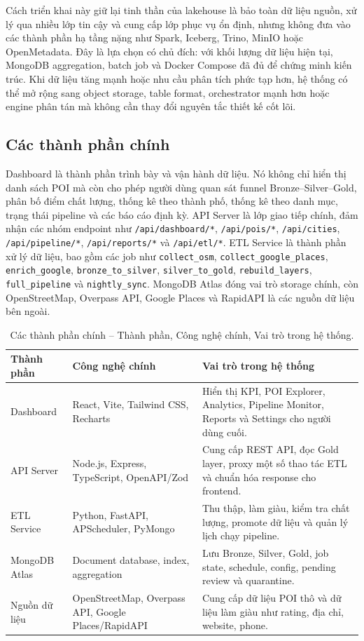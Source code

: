 \documentclass[12pt,a4paper]{article}
\begin{document}
Cách triển khai này giữ lại tinh thần của lakehouse là bảo toàn dữ liệu nguồn, xử lý qua nhiều lớp tin cậy và cung cấp lớp phục vụ ổn định, nhưng không đưa vào các thành phần hạ tầng nặng như Spark, Iceberg, Trino, MinIO hoặc OpenMetadata. Đây là lựa chọn có chủ đích: với khối lượng dữ liệu hiện tại, MongoDB aggregation, batch job và Docker Compose đã đủ để chứng minh kiến trúc. Khi dữ liệu tăng mạnh hoặc nhu cầu phân tích phức tạp hơn, hệ thống có thể mở rộng sang object storage, table format, orchestrator mạnh hơn hoặc engine phân tán mà không cần thay đổi nguyên tắc thiết kế cốt lõi.

\subsection{Các thành phần chính}

Dashboard là thành phần trình bày và vận hành dữ liệu. Nó không chỉ hiển thị danh sách POI mà còn cho phép người dùng quan sát funnel Bronze--Silver--Gold, phân bố điểm chất lượng, thống kê theo thành phố, thống kê theo danh mục, trạng thái pipeline và các báo cáo định kỳ. API Server là lớp giao tiếp chính, đảm nhận các nhóm endpoint như \texttt{/api/dashboard/*}, \texttt{/api/pois/*}, \texttt{/api/cities}, \texttt{/api/pipeline/*}, \texttt{/api/reports/*} và \texttt{/api/etl/*}. ETL Service là thành phần xử lý dữ liệu, bao gồm các job như \texttt{collect\_osm}, \texttt{collect\_google\_places}, \texttt{enrich\_google}, \texttt{bronze\_to\_silver}, \texttt{silver\_to\_gold}, \texttt{rebuild\_layers}, \texttt{full\_pipeline} và \texttt{nightly\_sync}. MongoDB Atlas đóng vai trò storage chính, còn OpenStreetMap, Overpass API, Google Places và RapidAPI là các nguồn dữ liệu bên ngoài.

\begin{longtable}{@{}p{}p{}p{}@{}}
\caption{Các thành phần chính -- Thành phần, Công nghệ chính, Vai trò trong hệ thống.}\\
\toprule
\textbf{Thành phần} & \textbf{Công nghệ chính} & \textbf{Vai trò trong hệ thống} \\
\midrule
Dashboard & React, Vite, Tailwind CSS, Recharts & Hiển thị KPI, POI Explorer, Analytics, Pipeline Monitor, Reports và Settings cho người dùng cuối. \\
API Server & Node.js, Express, TypeScript, OpenAPI/Zod & Cung cấp REST API, đọc Gold layer, proxy một số thao tác ETL và chuẩn hóa response cho frontend. \\
ETL Service & Python, FastAPI, APScheduler, PyMongo & Thu thập, làm giàu, kiểm tra chất lượng, promote dữ liệu và quản lý lịch chạy pipeline. \\
MongoDB Atlas & Document database, index, aggregation & Lưu Bronze, Silver, Gold, job state, schedule, config, pending review và quarantine. \\
Nguồn dữ liệu & OpenStreetMap, Overpass API, Google Places/RapidAPI & Cung cấp dữ liệu POI thô và dữ liệu làm giàu như rating, địa chỉ, website, phone. \\
\bottomrule
\end{longtable}
\end{document}
